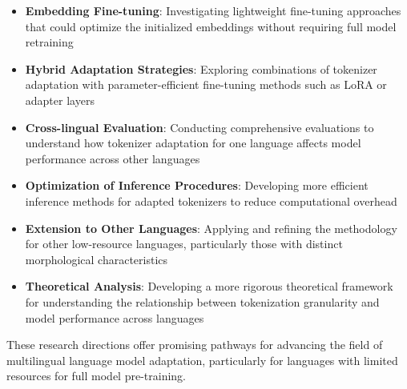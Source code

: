 \begin{itemize}
    \item \textbf{Embedding Fine-tuning}: Investigating lightweight fine-tuning approaches that could optimize the initialized embeddings without requiring full model retraining
    
    \item \textbf{Hybrid Adaptation Strategies}: Exploring combinations of tokenizer adaptation with parameter-efficient fine-tuning methods such as LoRA or adapter layers
    
    \item \textbf{Cross-lingual Evaluation}: Conducting comprehensive evaluations to understand how tokenizer adaptation for one language affects model performance across other languages
    
    \item \textbf{Optimization of Inference Procedures}: Developing more efficient inference methods for adapted tokenizers to reduce computational overhead
    
    \item \textbf{Extension to Other Languages}: Applying and refining the methodology for other low-resource languages, particularly those with distinct morphological characteristics
    
    \item \textbf{Theoretical Analysis}: Developing a more rigorous theoretical framework for understanding the relationship between tokenization granularity and model performance across languages
\end{itemize}

These research directions offer promising pathways for advancing the field of multilingual language model adaptation, particularly for languages with limited resources for full model pre-training.